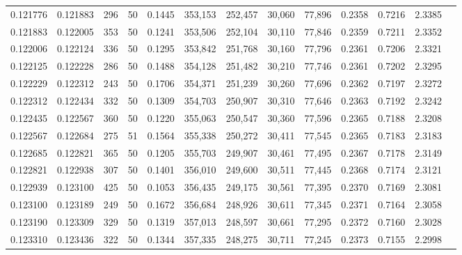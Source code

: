 \begin{tabular}{rrrrrrrrrrrrr}
0.121776 & 0.121883 &   296 &  50 &                                     0.1445 & 353,153 & 252,457 &  30,060 &  77,896 & 0.2358 & 0.7216 & 2.3385 \\
0.121883 & 0.122005 &   353 &  50 &                                     0.1241 & 353,506 & 252,104 &  30,110 &  77,846 & 0.2359 & 0.7211 & 2.3352 \\
0.122006 & 0.122124 &   336 &  50 &                                     0.1295 & 353,842 & 251,768 &  30,160 &  77,796 & 0.2361 & 0.7206 & 2.3321 \\
0.122125 & 0.122228 &   286 &  50 &                                     0.1488 & 354,128 & 251,482 &  30,210 &  77,746 & 0.2361 & 0.7202 & 2.3295 \\
0.122229 & 0.122312 &   243 &  50 &                                     0.1706 & 354,371 & 251,239 &  30,260 &  77,696 & 0.2362 & 0.7197 & 2.3272 \\
0.122312 & 0.122434 &   332 &  50 &                                     0.1309 & 354,703 & 250,907 &  30,310 &  77,646 & 0.2363 & 0.7192 & 2.3242 \\
0.122435 & 0.122567 &   360 &  50 &                                     0.1220 & 355,063 & 250,547 &  30,360 &  77,596 & 0.2365 & 0.7188 & 2.3208 \\
0.122567 & 0.122684 &   275 &  51 &                                     0.1564 & 355,338 & 250,272 &  30,411 &  77,545 & 0.2365 & 0.7183 & 2.3183 \\
0.122685 & 0.122821 &   365 &  50 &                                     0.1205 & 355,703 & 249,907 &  30,461 &  77,495 & 0.2367 & 0.7178 & 2.3149 \\
0.122821 & 0.122938 &   307 &  50 &                                     0.1401 & 356,010 & 249,600 &  30,511 &  77,445 & 0.2368 & 0.7174 & 2.3121 \\
0.122939 & 0.123100 &   425 &  50 &                                     0.1053 & 356,435 & 249,175 &  30,561 &  77,395 & 0.2370 & 0.7169 & 2.3081 \\
0.123100 & 0.123189 &   249 &  50 &                                     0.1672 & 356,684 & 248,926 &  30,611 &  77,345 & 0.2371 & 0.7164 & 2.3058 \\
0.123190 & 0.123309 &   329 &  50 &                                     0.1319 & 357,013 & 248,597 &  30,661 &  77,295 & 0.2372 & 0.7160 & 2.3028 \\
0.123310 & 0.123436 &   322 &  50 &                                     0.1344 & 357,335 & 248,275 &  30,711 &  77,245 & 0.2373 & 0.7155 & 2.2998 \\

\end{tabular}
